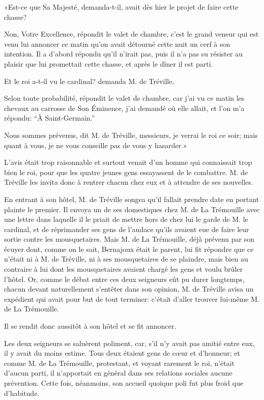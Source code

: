 «Est-ce que Sa Majesté, demanda-t-il, avait dès hier le projet de faire cette chasse? 

\speak  Non, Votre Excellence, répondit le valet de chambre, c'est le grand veneur qui est venu lui annoncer ce matin qu'on avait détourné cette nuit un cerf à son intention. Il a d'abord répondu qu'il n'irait pas, puis il n'a pas su résister au plaisir que lui promettait cette chasse, et après le dîner il est parti. 

\speak  Et le roi a-t-il vu le cardinal? demanda M. de Tréville. 

\speak  Selon toute probabilité, répondit le valet de chambre, car j'ai vu ce matin les chevaux au carrosse de Son Éminence, j'ai demandé où elle allait, et l'on m'a répondu: “À Saint-Germain.” 

\speak  Nous sommes prévenus, dit M. de Tréville, messieurs, je verrai le roi ce soir; mais quant à vous, je ne vous conseille pas de vous y hasarder.» 

L'avis était trop raisonnable et surtout venait d'un homme qui connaissait trop bien le roi, pour que les quatre jeunes gens essayassent de le combattre. M. de Tréville les invita donc à rentrer chacun chez eux et à attendre de ses nouvelles. 

En entrant à son hôtel, M. de Tréville songea qu'il fallait prendre date en portant plainte le premier. Il envoya un de ses domestiques chez M. de La Trémouille avec une lettre dans laquelle il le priait de mettre hors de chez lui le garde de M. le cardinal, et de réprimander ses gens de l'audace qu'ils avaient eue de faire leur sortie contre les mousquetaires. Mais M. de La Trémouille, déjà prévenu par son écuyer dont, comme on le sait, Bernajoux était le parent, lui fit répondre que ce n'était ni à M. de Tréville, ni à ses mousquetaires de se plaindre, mais bien au contraire à lui dont les mousquetaires avaient chargé les gens et voulu brûler l'hôtel. Or, comme le débat entre ces deux seigneurs eût pu durer longtemps, chacun devant naturellement s'entêter dans son opinion, M. de Tréville avisa un expédient qui avait pour but de tout terminer: c'était d'aller trouver lui-même M. de La Trémouille. 

Il se rendit donc aussitôt à son hôtel et se fit annoncer. 

Les deux seigneurs se saluèrent poliment, car, s'il n'y avait pas amitié entre eux, il y avait du moins estime. Tous deux étaient gens de cœur et d'honneur; et comme M. de La Trémouille, protestant, et voyant rarement le roi, n'était d'aucun parti, il n'apportait en général dans ses relations sociales aucune prévention. Cette fois, néanmoins, son accueil quoique poli fut plus froid que d'habitude. 


